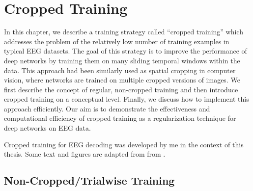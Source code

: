 \chapter{Cropped Training}\label{cropped-training}


    In this chapter, we describe a training strategy called ``cropped
training'' which addresses the problem of the relatively low number of
training examples in typical EEG datasets. The goal of this strategy is
to improve the performance of deep networks by training them on many
sliding temporal windows within the data. This approach had been
similarly used as spatial cropping in computer vision, where networks
are trained on multiple cropped versions of images. We first describe
the concept of regular, non-cropped training and then introduce cropped
training on a conceptual level. Finally, we discuss how to implement
this approach efficiently. Our aim is to demonstrate the effectiveness
and computational efficiency of cropped training as a regularization
technique for deep networks on EEG data.

Cropped training for EEG decoding was developed by me in the context of
this thesis. Some text and figures are adapted from from
\cite{schirrmeisterdeephbm2017}.


\section{Non-Cropped/Trialwise
Training}\label{non-croppedtrialwise-training}



